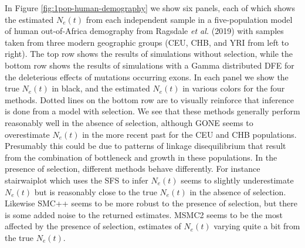 \documentclass[hidelinks]{article}
\begin{document}
    In Figure \ref{fig:1pop-human-demography} we show six panels, each of which shows the estimated $N_e(t)$
    from each independent sample in a five-population model of human out-of-Africa demography
    from Ragsdale \textit{et al.} (2019)
    with samples taken from three modern geographic groups (CEU, CHB, and YRI from left to right).
    The top row shows the results of simulations without selection, while the bottom row shows the results
    of simulations with a Gamma distributed DFE for the deleterious effects of mutations occurring exons. In each panel we show the true $N_e(t)$ in black, and the estimated $N_e(t)$
    in various colors for the four methods. Dotted lines on the bottom row are to visually reinforce that inference is done
    from a model with selection. We see that these methods generally perform reasonably well in the absence of selection, 
    although GONE seems to overestimate $N_e(t)$ in the more recent past for the CEU and CHB populations.
    Presumably this could be due to patterns of linkage disequilibrium that result from the combination
    of bottleneck and growth in these populations.
    In the presence of selection, different methods behave differently. 
    For instance stairwaiplot which uses the SFS to infer $N_e(t)$ seems to slightly underestimate $N_e(t)$
    but is reasonably close to the true $N_e(t)$ in the absence of selection.
    Likewise SMC++ seems to be more robust to the presence of selection,
    but there is some added noise to the returned estimates. 
    MSMC2 seems to be the most affected by the presence of selection, 
    estimates of $N_e(t)$ varying quite a bit from the true $N_e(t)$.
\end{document}
